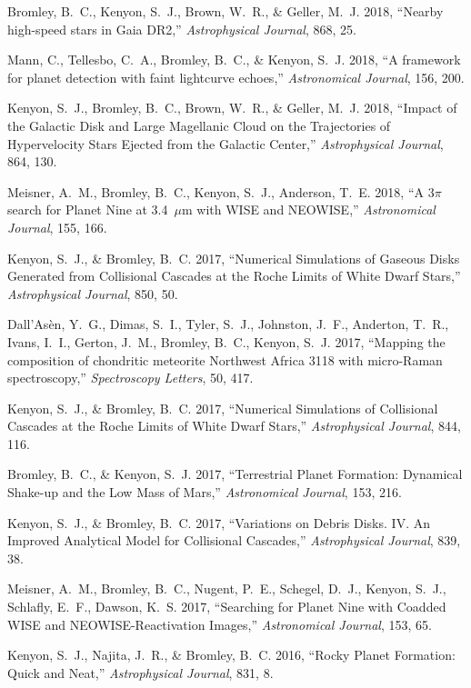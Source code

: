 \documentclass[11pt]{article}
\def\refitem{} %
\begin{document}
\refitem Bromley, B.~C., Kenyon, S.~J., Brown, W.~R., \& Geller, M.~J. 2018, 
``Nearby high-speed stars in Gaia DR2,''
{\em Astrophysical Journal}, 868, 25.

\refitem Mann, C., Tellesbo, C.~A., Bromley, B.~C., \& Kenyon, S.~J. 2018, ``A framework for planet detection with faint lightcurve echoes,''
{\em Astronomical Journal}, 156, 200.

\refitem Kenyon, S.~J., Bromley, B.~C., Brown, W.~R., \& Geller, M.~J. 2018, ``Impact of the Galactic Disk and Large Magellanic Cloud on the Trajectories of Hypervelocity Stars Ejected from the Galactic Center,''
{\em Astrophysical Journal}, 864, 130.

\refitem Meisner, A.~M., Bromley, B.~C., Kenyon, S.~J., Anderson, T.~E. 2018, ``A 3$\pi$
search for Planet Nine at 3.4~$\mu$m with WISE and NEOWISE,''
{\em Astronomical Journal}, 155, 166.

\refitem Kenyon, S.~J., \& Bromley, B.~C. 2017, ``Numerical Simulations of Gaseous Disks Generated from Collisional Cascades at the Roche Limits of White Dwarf Stars,''
{\em Astrophysical Journal}, 850, 50.


\refitem Dall'As\`{e}n, Y.~G., Dimas, S.~I., Tyler, S.~J., Johnston, J.~F., 
Anderton, T.~R., Ivans, I.~I., Gerton, J.~M., Bromley, B.~C., Kenyon, S.~J.
2017, ``Mapping the composition of chondritic meteorite Northwest Africa 3118 with micro-Raman spectroscopy,'' {\em Spectroscopy Letters}, 50, 417.

\refitem Kenyon, S.~J., \& Bromley, B.~C. 2017, ``Numerical Simulations of Collisional Cascades at the Roche Limits of White Dwarf Stars,''
{\em Astrophysical Journal}, 844, 116.


\refitem Bromley, B.~C., \& Kenyon, S.~J. 2017, ``Terrestrial Planet
Formation: Dynamical Shake-up and the Low Mass of Mars,'' {\em
  Astronomical Journal}, 153, 216.

\refitem Kenyon, S.~J., \& Bromley, B.~C. 2017, ``Variations on Debris
Disks. IV. An Improved Analytical Model for Collisional Cascades,''
{\em Astrophysical Journal}, 839, 38.


\refitem Meisner, A.~M., Bromley, B.~C., Nugent, P.~E., Schegel,
D.~J., Kenyon, S.~J., Schlafly, E.~F., Dawson, K.~S. 2017, ``Searching
for Planet Nine with Coadded WISE and NEOWISE-Reactivation Images,''
{\em Astronomical Journal}, 153, 65.

\refitem Kenyon, S.~J., Najita, J.~R., \& Bromley, B.~C. 2016, ``Rocky Planet 
Formation: Quick and Neat,''
{\em Astrophysical Journal}, 831, 8.
\end{document}
